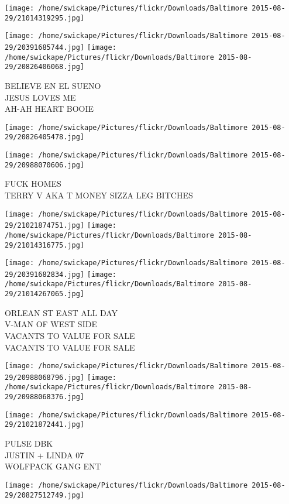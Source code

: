 \documentclass[10pt,letterpaper]{article}
\begin{document}
\texttt{[image: /home/swickape/Pictures/flickr/Downloads/Baltimore 2015-08-29/21014319295.jpg]}

\vspace{0.25in}
\texttt{[image: /home/swickape/Pictures/flickr/Downloads/Baltimore 2015-08-29/20391685744.jpg]}
\texttt{[image: /home/swickape/Pictures/flickr/Downloads/Baltimore 2015-08-29/20826406068.jpg]}

BELIEVE EN EL SUENO\\
JESUS LOVES ME\\
AH{-}AH HEART BOOIE
\pagebreak

\texttt{[image: /home/swickape/Pictures/flickr/Downloads/Baltimore 2015-08-29/20826405478.jpg]}

\vspace{0.25in}
\texttt{[image: /home/swickape/Pictures/flickr/Downloads/Baltimore 2015-08-29/20988070606.jpg]}

FUCK HOMES\\
TERRY V AKA T MONEY SIZZA LEG BITCHES
\pagebreak

\texttt{[image: /home/swickape/Pictures/flickr/Downloads/Baltimore 2015-08-29/21021874751.jpg]}
\texttt{[image: /home/swickape/Pictures/flickr/Downloads/Baltimore 2015-08-29/21014316775.jpg]}

\texttt{[image: /home/swickape/Pictures/flickr/Downloads/Baltimore 2015-08-29/20391682834.jpg]}
\texttt{[image: /home/swickape/Pictures/flickr/Downloads/Baltimore 2015-08-29/21014267065.jpg]}

ORLEAN ST EAST ALL DAY\\
V{-}MAN OF WEST SIDE\\
VACANTS TO VALUE FOR SALE\\
VACANTS TO VALUE FOR SALE
\pagebreak

\texttt{[image: /home/swickape/Pictures/flickr/Downloads/Baltimore 2015-08-29/20988068796.jpg]}
\texttt{[image: /home/swickape/Pictures/flickr/Downloads/Baltimore 2015-08-29/20988068376.jpg]}

\texttt{[image: /home/swickape/Pictures/flickr/Downloads/Baltimore 2015-08-29/21021872441.jpg]}

PULSE DBK\\
JUSTIN + LINDA 07\\
WOLFPACK GANG ENT
\pagebreak

\texttt{[image: /home/swickape/Pictures/flickr/Downloads/Baltimore 2015-08-29/20827512749.jpg]}
\end{document}
